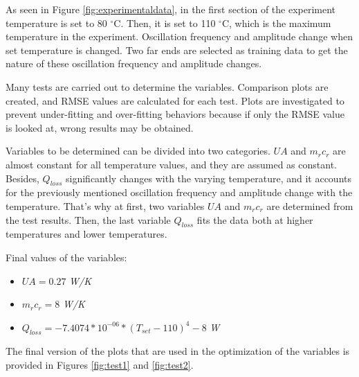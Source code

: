 As seen in Figure \ref{fig:experimentaldata}, in the first section of the experiment temperature is set to 80 $^\circ$C. Then, it is set to 110 $^\circ$C, which is the maximum temperature in the experiment. Oscillation frequency and amplitude change when set temperature is changed. Two far ends are selected as training data to get the nature of these oscillation frequency and amplitude changes.
\par
Many tests are carried out to determine the variables. Comparison plots are created, and RMSE values are calculated for each test. Plots are investigated to prevent under-fitting and over-fitting behaviors because if only the RMSE value is looked at, wrong results may be obtained.
\par
Variables to be determined can be divided into two categories. $UA$ and $m_{r}c_{r}$ are almost constant for all temperature values, and they are assumed as constant. Besides, $Q_{loss}$ significantly changes with the varying temperature, and it accounts for the previously mentioned oscillation frequency and amplitude change with the temperature. That's why at first, two variables $UA$ and $m_{r}c_{r}$ are determined from the test results. Then, the last variable $Q_{loss}$ fits the data both at higher temperatures and lower temperatures.
\par
Final values of the variables:
\begin{itemize}
    \item $UA = 0.27$ \textit{W/K}
    \item $m_{r}c_{r} = 8$ \textit{W/K}
    \item $Q_{loss} = -7.4074*10^{-06}*(T_{set}-110)^4 - 8$ \textit{W}
\end{itemize}

The final version of the plots that are used in the optimization of the variables is provided in Figures \ref{fig:test1} and \ref{fig:test2}.

